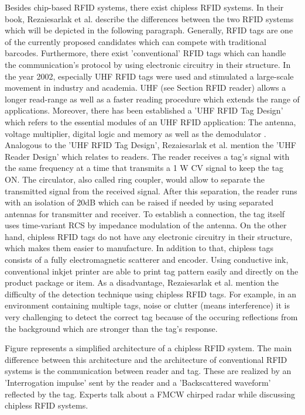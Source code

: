 Besides chip-based RFID systems, there exist chipless RFID systems. In their book, Rezaiesarlak et al. \cite{chipless} describe the differences between the two RFID systems which will be depicted in the following paragraph.
Generally, RFID tags are one of the currently proposed candidates which can compete with traditional barcodes. Furthermore, there exist 'conventional' RFID tags which can handle the communication's protocol by using electronic circuitry in their structure. In the year 2002, especially UHF RFID tags were used and stimulated a large-scale movement in industry and academia. UHF (see Section RFID reader\pageref{reader}) allows a longer read-range as well as a faster reading procedure which extends the range of applications. Moreover, there has been established a 'UHF RFID Tag Design' which refers to the essential modules of an UHF RFID application: The antenna, voltage multiplier, digital logic and memory as well as the demodulator \cite[p.12 ff.]{chipless}. Analogous to the 'UHF RFID Tag Design',  Rezaiesarlak et al. mention the 'UHF Reader Design' which relates to readers. The reader receives a tag's signal with the same frequency at a time that transmits a 1 W \ac{CV} signal to keep the tag ON. The circulator, also called ring coupler, would allow to separate the transmitted signal from the received signal. After this separation, the reader runs with an isolation of 20dB which can be raised if needed by using separated antennas for transmitter and receiver. To establish a connection, the tag itself uses time-variant \ac{RCS} by impedance modulation of the antenna. 
On the other hand, chipless RFID tags do not have any electronic circuitry in their structure, which makes them easier to manufacture. In addition to that, chipless tags consists of a fully electromagnetic scatterer and encoder. Using conductive ink, conventional inkjet printer are able to print tag pattern easily and directly on the product package or item. As a disadvantage, Rezaiesarlak et al. \cite[p.12 ff.]{chipless} mention the difficulty of the detection technique using chipless RFID tags. For example, in an environment containing multiple tags, noise or clutter (means interference) it is very challenging to detect the correct tag because of the occuring reflections from the background which are stronger than the tag's response. 

Figure \pageref{fig:chipless_architecture} represents a simplified architecture of a chipless RFID system. The main difference between this architecture and the architecture of conventional RFID systems is the communication between reader and tag. These are realized by an 'Interrogation impulse' sent by the reader and a 'Backscattered waveform' reflected by the tag. Experts talk about a \ac{FMCW} chirped radar while discussing chipless RFID systems. 

